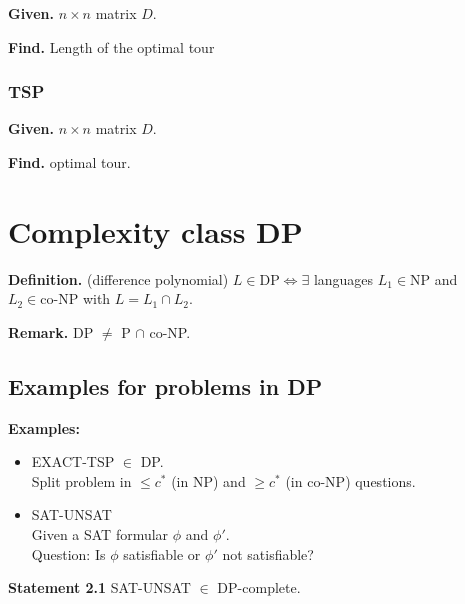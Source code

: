 \documentclass[a4paper]{article}
\newcommand{\given}[1]{\textbf{Given.} #1\par}
\newcommand{\find}[1]{\textbf{Find.} #1\par}
\newcommand{\cls}[1]{\rm{#1}}
\newcommand{\probl}[1]{\text{\textsc{#1}}}
\newenvironment{spec}[0]{\begin{framed}}{\end{framed}}
\begin{document}
\subsubsection{\probl{TSP-Cost}}
%
\begin{spec}
  \given{$n\times n$ matrix $D$.}
  \find{Length of the optimal tour}
\end{spec}

\subsubsection{TSP}
%
\begin{spec}
  \given{$n\times n$ matrix $D$.}
  \find{optimal tour.}
\end{spec}

\section{Complexity class \cls{DP}}

\textbf{Definition.} (difference polynomial) $L \in \text{DP} \Leftrightarrow
\exists$ languages $L_1 \in \text{NP}$ and $L_2 \in \text{co-NP}$ with
$L = L_1 \cap L_2$.

\textbf{Remark.} \cls{DP} $\neq$ P $\cap$ \cls{co-NP}.

\subsection{Examples for problems in \cls{DP}}
%
\textbf{Examples:}
\begin{itemize}
  \item EXACT-TSP $\in$ \cls{DP}. \\
        Split problem in $\leq c^*$ (in \cls{NP}) and $\geq c^*$ (in \cls{co-NP}) questions.
  \item SAT-UNSAT \\
        Given a SAT formular $\phi$ and $\phi'$. \\
        Question: Is $\phi$ satisfiable or $\phi'$ not satisfiable?
\end{itemize}

\textbf{Statement 2.1} SAT-UNSAT $\in$ \cls{DP}-complete.
\end{document}
